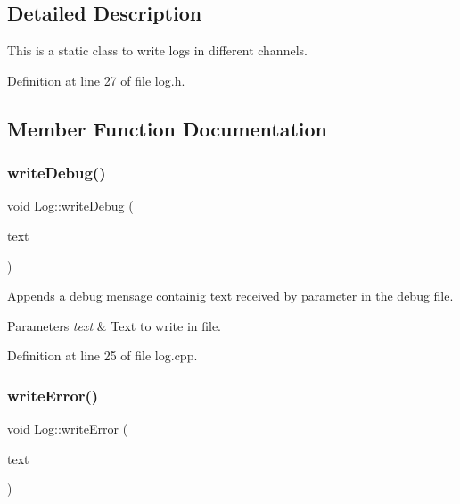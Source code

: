 \subsection{Detailed Description}
This is a static class to write logs in different channels. 

Definition at line 27 of file log.\+h.



\subsection{Member Function Documentation}
\mbox{\label{classLog_a8291d71e5438b70ac71232a23606690a}} 
\subsubsection{\texorpdfstring{write\+Debug()}{writeDebug()}}
{\footnotesize\ttfamily void Log\+::write\+Debug (\begin{DoxyParamCaption}\item[{Q\+String}]{text }\end{DoxyParamCaption})\hspace{0.3cm}{\ttfamily [static]}}



Appends a debug mensage containig text received by parameter in the debug file. 


\begin{DoxyParams}{Parameters}
{\em text} & Text to write in file. \\
\hline
\end{DoxyParams}


Definition at line 25 of file log.\+cpp.

\mbox{\label{classLog_ae35819424f49efa88b29a0bccc962f93}} 
\subsubsection{\texorpdfstring{write\+Error()}{writeError()}}
{\footnotesize\ttfamily void Log\+::write\+Error (\begin{DoxyParamCaption}\item[{Q\+String}]{text }\end{DoxyParamCaption})\hspace{0.3cm}{\ttfamily [static]}}



